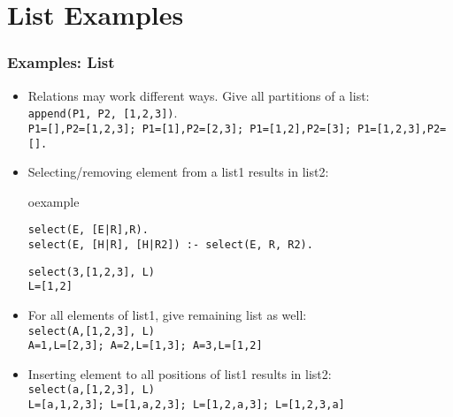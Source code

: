 \section{List Examples}
\begin{frame}[fragile]
\frametitle{Examples: List}
\begin{itemize}
\item Relations may work different ways. Give all partitions of a list:\\
\lstinline!append(P1, P2, [1,2,3])!. \\
\lstinline[basicstyle=\tiny\ttfamily]!P1=[],P2=[1,2,3]; P1=[1],P2=[2,3]; P1=[1,2],P2=[3]; P1=[1,2,3],P2=[].!
\item Selecting/removing element from a list1 results in list2:\\
\begin{beamercolorbox}{oexample}
\begin{lstlisting}
select(E, [E|R],R).
select(E, [H|R], [H|R2]) :- select(E, R, R2).
\end{lstlisting}
\end{beamercolorbox}
\lstinline!select(3,[1,2,3], L)!\\
\lstinline!L=[1,2]!\\
\item For all elements of list1, give remaining list as well:\\
\lstinline!select(A,[1,2,3], L)!\\
\lstinline!A=1,L=[2,3]; A=2,L=[1,3]; A=3,L=[1,2]!
\item Inserting element to all positions of list1 results in list2:\\
\lstinline!select(a,[1,2,3], L)!\\
\lstinline[basicstyle=\scriptsize\ttfamily]!L=[a,1,2,3]; L=[1,a,2,3]; L=[1,2,a,3]; L=[1,2,3,a]! 
\end{itemize}
\end{frame}

